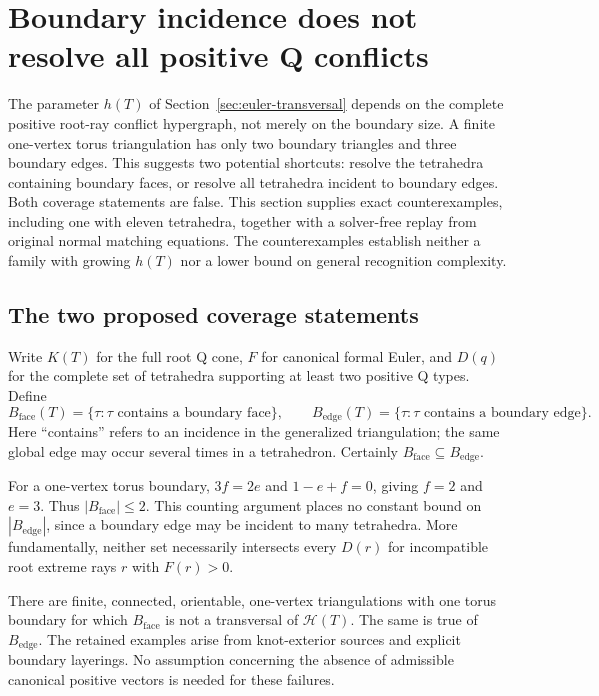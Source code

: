 \section{Boundary incidence does not resolve all positive Q conflicts}
\label{sec:boundary-transversal}

The parameter $h(T)$ of Section~\ref{sec:euler-transversal} depends on
the complete positive root-ray conflict hypergraph, not merely on the
boundary size.  A finite one-vertex torus triangulation has only two
boundary triangles and three boundary edges.  This suggests two potential
shortcuts: resolve the tetrahedra containing boundary faces, or resolve
all tetrahedra incident to boundary edges.  Both coverage statements are
false.  This section supplies exact counterexamples, including one with
eleven tetrahedra, together with a solver-free replay from original normal
matching equations.  The counterexamples establish neither a family with
growing $h(T)$ nor a lower bound on general recognition complexity.

\subsection{The two proposed coverage statements}

Write $K(T)$ for the full root Q cone, $F$ for canonical formal Euler,
and $D(q)$ for the complete set of tetrahedra supporting at least two
positive Q types.  Define
\[
 B_{\mathrm{face}}(T)=\{\tau:\tau\text{ contains a boundary face}\},
 \qquad
 B_{\mathrm{edge}}(T)=\{\tau:\tau\text{ contains a boundary edge}\}.
\]
Here ``contains'' refers to an incidence in the generalized triangulation;
the same global edge may occur several times in a tetrahedron.  Certainly
$B_{\mathrm{face}}\subseteq B_{\mathrm{edge}}$.

For a one-vertex torus boundary, $3f=2e$ and $1-e+f=0$, giving
$f=2$ and $e=3$.  Thus $|B_{\mathrm{face}}|\le2$.  This counting
argument places no constant bound on $|B_{\mathrm{edge}}|$, since a
boundary edge may be incident to many tetrahedra.  More fundamentally,
neither set necessarily intersects every $D(r)$ for incompatible root
extreme rays $r$ with $F(r)>0$.

\begin{proposition}
\label{prop:boundary-conflict-failure}
There are finite, connected, orientable, one-vertex triangulations with
one torus boundary for which $B_{\mathrm{face}}$ is not a transversal
of $\mathcal H(T)$.  The same is true of $B_{\mathrm{edge}}$.
The retained examples arise from knot-exterior sources and explicit
boundary layerings.  No assumption concerning the absence of admissible
canonical positive vectors is needed for these failures.
\end{proposition}

